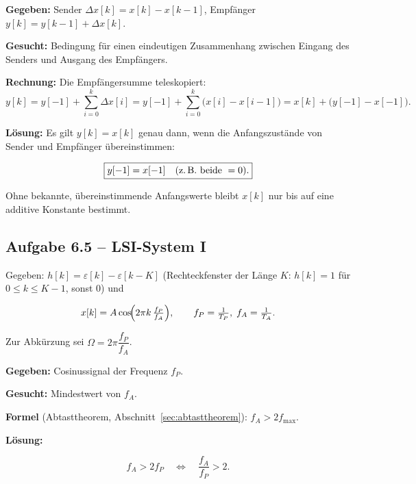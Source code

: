 \begin{beispiel}

\textbf{Gegeben:} Sender $\Delta x[k]=x[k]-x[k-1]$, Empfänger
$y[k]=y[k-1]+\Delta x[k]$.

\textbf{Gesucht:} Bedingung für einen eindeutigen Zusammenhang zwischen
Eingang des Senders und Ausgang des Empfängers.

\textbf{Rechnung:} Die Empfängersumme teleskopiert:
$$
y[k]=y[-1]+\sum_{i=0}^{k}\Delta x[i]
    =y[-1]+\sum_{i=0}^{k}\bigl(x[i]-x[i-1]\bigr)
    =x[k]+\bigl(y[-1]-x[-1]\bigr).
$$

\textbf{Lösung:} Es gilt $y[k]=x[k]$ genau dann, wenn die Anfangszustände
von Sender und Empfänger übereinstimmen:

$$
\boxed{y[-1]=x[-1]\quad(\text{z.\,B. beide }=0).}
$$

Ohne bekannte, übereinstimmende Anfangswerte bleibt $x[k]$ nur bis auf
eine additive Konstante bestimmt.

\end{beispiel}

\subsection*{Aufgabe 6.5 – LSI-System I}

Gegeben: $h[k]=\varepsilon[k]-\varepsilon[k-K]$ (Rechteckfenster der Länge
$K$: $h[k]=1$ für $0\le k\le K-1$, sonst $0$) und

$$
x[k]=A\cos\!\Bigl(2\pi k\,\tfrac{f_P}{f_A}\Bigr),\qquad
f_P=\tfrac{1}{T_P},\; f_A=\tfrac{1}{T_A}.
$$

Zur Abkürzung sei $\Omega=2\pi\dfrac{f_P}{f_A}$.

\begin{beispiel}[6.5a) Abtasttheorem]

\textbf{Gegeben:} Cosinussignal der Frequenz $f_P$.

\textbf{Gesucht:} Mindestwert von $f_A$.

\textbf{Formel} (Abtasttheorem, Abschnitt~\ref{sec:abtasttheorem}):
$f_A>2f_{\max}$.

\textbf{Lösung:}

$$
\boxed{f_A > 2 f_P \quad\Longleftrightarrow\quad \frac{f_A}{f_P}>2.}
$$

\end{beispiel}

